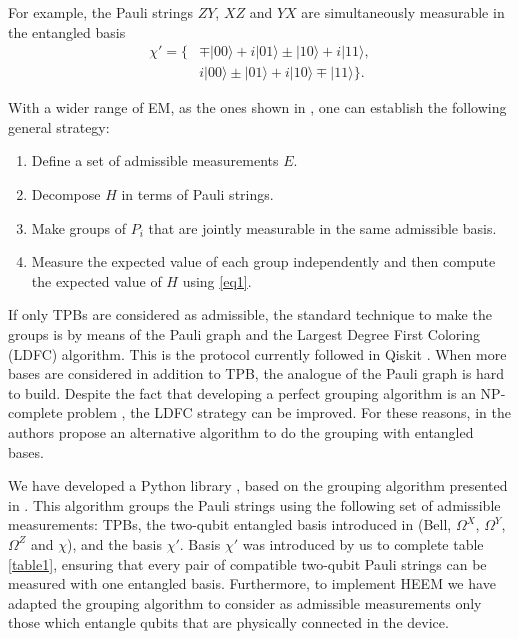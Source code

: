 \documentclass[11pt, twocolumn]{article}
\begin{document}
\pagebreak For example, the Pauli strings $ZY$, $XZ$ and $YX$ are simultaneously measurable in the entangled basis 
\begin{align} \label{chitilde}
    \chi'=\{& \mp|00\rangle+i|01\rangle\pm|10\rangle+i|11\rangle,\\ \nonumber
            & i|00\rangle \pm|01\rangle +i|10\rangle \mp |11\rangle \}. 
\end{align}

\noindent With a wider range of EM, as the ones shown in \cite{hamamura2020efficient}, one can establish the following general strategy:
\begin{enumerate}
    \item Define a set of admissible measurements $E$.\label{step1}
    \item Decompose $H$ in terms of Pauli strings.\label{step2}
    \item Make groups of $P_i$ that are jointly measurable in the same admissible basis. \label{step3}
    \item Measure the expected value of each group independently and then compute the expected value of $H$ using \eqref{eq1}.\label{step4}
\end{enumerate}
\noindent If only TPBs are considered as admissible, the standard technique to make the groups is by means of the Pauli graph and the Largest Degree First Coloring (LDFC) algorithm. This is the protocol currently followed in Qiskit \cite{QISKIT}. When more bases are considered in addition to TPB, the analogue of the Pauli graph is hard to build. Despite the fact that developing a perfect grouping algorithm is an NP-complete problem \cite{Coloring}, the LDFC strategy can be improved. For these reasons, in \cite{hamamura2020efficient} the authors propose an alternative algorithm to do the grouping with entangled bases. 

 We have developed a Python library \cite{github}, based on the grouping algorithm presented in \cite{hamamura2020efficient}. This algorithm groups the Pauli strings using the following set of admissible measurements: TPBs, the two-qubit entangled basis introduced in \cite{hamamura2020efficient} (Bell, $\Omega^X$, $\Omega^Y$, $\Omega^Z$ and $\chi$), and the basis $\chi'$. Basis $\chi'$ was introduced by us to complete table \ref{table1}, ensuring that every pair of compatible two-qubit Pauli strings can be measured with one entangled basis. Furthermore, to implement HEEM we have adapted the grouping algorithm to consider as admissible measurements only those which entangle qubits that are physically connected in the device.
   
\end{document}
